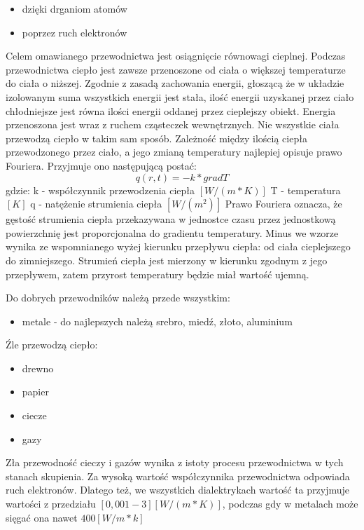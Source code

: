 \begin{itemize}
\item dzięki drganiom atomów
\item poprzez ruch elektronów
\end {itemize}
Celem omawianego przewodnictwa jest 
osiągnięcie równowagi cieplnej. Podczas przewodnictwa ciepło jest zawsze przenoszone od
ciała o większej temperaturze do ciała o niższej. Zgodnie z zasadą zachowania energii, głoszącą że w układzie 
izolowanym suma wszystkich energii jest stała, ilość energii uzyskanej przez ciało chłodniejsze jest równa
ilości energii oddanej przez cieplejszy obiekt. Energia przenoszona jest wraz z ruchem cząsteczek wewnętrznych.
Nie wszystkie ciała przewodzą ciepło w takim sam sposób.
Zależność między ilością ciepła przewodzonego przez ciało, a jego zmianą temperatury najlepiej opisuje prawo Fouriera.
Przyjmuje ono następującą postać:
\begin{equation}
 q(r,t)=-k*grad T
 \label{eqn:fourier}
\end {equation}
gdzie:
k - współczynnik przewodzenia ciepła $[W / (m*K)]$
T - temperatura $[K]$
q - natężenie strumienia ciepła  $[W/(m^2)]$
Prawo Fouriera oznacza, że gęstość strumienia ciepła przekazywana w jednostce czasu przez jednostkową powierzchnię 
jest proporcjonalna do gradientu temperatury. Minus we wzorze wynika ze wspomnianego wyżej kierunku przepływu ciepła:
od ciała cieplejszego do zimniejszego. Strumień ciepła jest mierzony w kierunku zgodnym z jego przepływem, zatem przyrost
temperatury będzie miał wartość ujemną.


Do dobrych przewodników należą przede wszystkim:
\begin {itemize}
\item metale - do najlepszych należą srebro, miedź, złoto, aluminium
\end {itemize}
Źle przewodzą ciepło:
\begin {itemize}
\item drewno
\item papier
\item ciecze
\item gazy
\end {itemize}
Zła przewodność cieczy i gazów wynika z istoty procesu przewodnictwa w tych stanach skupienia. Za wysoką wartość 
współczynnika przewodnictwa odpowiada ruch elektronów. Dlatego też, we wszystkich dialektrykach wartość ta
przyjmuje wartości z przedziału $[0,001-3][W/(m*K)]$, podczas gdy w metalach może sięgać ona nawet $ 400 [W/m*k]$

